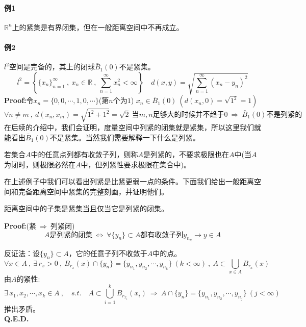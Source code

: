 \paragraph*{例1} $\mathbb{R}^n$上的紧集是有界闭集，但在一般距离空间中不再成立。

\paragraph*{例2} $l^2$空间是完备的，其上的闭球$\bar{B}_1(0)$不是紧集。
\[l^2=\left\{\{x_n\}_{n=1}^{\infty} \ , \ x_n \in \mathbb{R} \ , \ \sum_{n=1}^{\infty}x_n^2<\infty\right\} \quad d(x,y)=\sqrt{\sum_{n=1}^{\infty}(x_n-y_n)^2}\]
\textbf{Proof:}令$x_n=\{0,0,\cdots,1,0,\cdots\}$(第$n$个为$1$) \quad $x_n \in \bar{B}_1(0) \ (d(x_n,0)=\sqrt{1^2}=1)$
\[\forall n \neq m \ , \ d(x_n,x_m)=\sqrt{1^2+1^2}=\sqrt{2} \ \text{当$m,n$足够大的时候并不趋于0} \ \Rightarrow \ \bar{B}_1(0)\text{不是列紧的}\]
在后续的介绍中，我们会证明，度量空间中列紧的闭集就是紧集，所以这里我们就能看出$\bar{B}_1(0)$不是紧集。当然我们需要解释一下什么是列紧。
\begin{definition}[(相对)列紧性]
    若集合$A$中的任意点列都有收敛子列，则称$A$是列紧的，不要求极限也在$A$中(当$A$为闭时，则极限必然在$A$中，但列紧性要求极限在集合中)。
\end{definition}
在上述例子中我们可以看出列紧是比紧更弱一点的条件。下面我们给出一般距离空间和完备距离空间中紧集的完整刻画，并证明他们。
\begin{theorem}
    距离空间中的子集是紧集当且仅当它是列紧的闭集。
\end{theorem}
\textbf{Proof:}(紧$ \ \Rightarrow \ $列紧闭)
\[A \text{是列紧的闭集} \ \Leftrightarrow \ \forall\{y_n\} \subset A\text{都有收敛子列}y_{n_k} \to y \in A\]

反证法：设$\{y_n\} \subset A$，它的任意子列不收敛于$A$中的点。
\[\forall x \in A \ , \ \exists \, r_x>0 \ , \ B_{r_x}(x) \cap \{y_n\}=\{y_{n_1},y_{n_2},\cdots,y_{n_k}\} \ (k<\infty) \ , \ A \subset \bigcup_{x\in A}B_{r_x}(x)\]
由$A$的紧性:
\[\exists \, x_1,x_2,\cdots,x_k \in A \ , \quad s.t. \quad A \subset \bigcup_{i=1}^kB_{r_{x_i}}(x_i) \ \Rightarrow \ A \cap \{y_n\}=\{y_{n_1},y_{n_2},\cdots,y_{n_j}\} \ (j<\infty)\]
推出矛盾。\\
\textbf{Q.E.D.}


